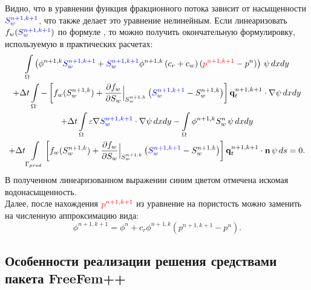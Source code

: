 Видно, что в уравнении  функция фракционного потока зависит от насыщенности ${\color{blue}S_w^{n+1,k+1}}$, 
что также делает это уравнение нелинейным. Если линеаризовать $f_w({\color{blue}S_w^{n+1,k+1}})$ по формуле ,
то можно получить окончательную формулировку, используемую в практических расчетах:
\begin{multline}\label{eq:saturation_num_linear}
	\int\limits_\Omega \left(\phi^{n+1,k} {\color{blue}S_w^{n+1,k+1}}
	+ {\color{blue}S_w^{n+1,k+1}}\phi^{n+1,k}\left(c_r + c_w \right)({\color{red}p^{n+1,k+1}} - p^n)  \right)\,\psi \,dx dy \\
	+ \Delta t\int\limits_\Omega -\left[f_w(S_w^{n+1, k}) + \dfrac{\partial f_w}{\partial S_w}\Bigl|_{S_w^{n+1, k}}\Bigr. \left({\color{blue} S_w^{n+1, k+1}} - S_w^{n+1, k} \right) \right] \mathbf{q}_t^{n+1, k+1} \cdot \nabla \psi \,dx dy\\
	+ \Delta t\int\limits_\Omega \varepsilon \nabla {\color{blue}S_w^{n+1,k+1}} \cdot \nabla \psi \,dx dy 
	-\int\limits_\Omega \phi^{n+1,k} S_w^{n} \,\psi \,dx dy \\
	+\Delta t\int\limits_{\Gamma_{prod}} \left[f_w(S_w^{n+1, k}) + \dfrac{\partial f_w}{\partial S_w}\Bigl|_{S_w^{n+1, k}}\Bigr. \left({\color{blue} S_w^{n+1, k+1}} - S_w^{n+1, k} \right) \right] \mathbf{q}_t^{n+1, k+1} \cdot \mathbf{n} \,\psi \, ds = 0.
\end{multline}
В полученном линеаризованном выражении  синим цветом отмечена искомая водонасыщенность.\\
Далее, после нахождения $\color{red}p^{n+1, k+1}$ из  уравнение на пористость  можно 
заменить на численную аппроксимацию вида:
\begin{equation}
	\phi^{n+1, k+1} = \phi^n + c_r \phi^{n+1, k} (p^{n+1, k+1} - p^n).
\end{equation}


\subsection{Особенности реализации решения средствами пакета FreeFem++}

